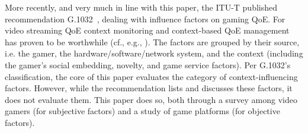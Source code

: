 More recently, and very much in line with this paper, the \acrshort{ITU-T}
published recommendation G.1032~\cite{mollertowards, itutg1032}, dealing with
influence factors on gaming \gls{QoE}. For video streaming \gls{QoE} context
monitoring and context-based \gls{QoE} management has proven to be worthwhile
(cf., e.g., \cite{7140480}). The factors are grouped by
their source, i.e. the gamer, the hardware/software/network system,
and the context (including the gamer's social embedding, novelty,
and game service factors). Per G.1032's classification, the core of
this paper evaluates the category of context-influencing factors.
However, while the recommendation lists and discusses these factors,
it does not evaluate them. This paper does so, both through a survey
among video gamers (for subjective factors) and a study of
game platforms (for objective factors).
